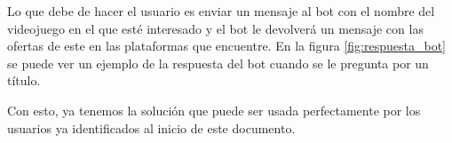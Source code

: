 Lo que debe de hacer el usuario es enviar un mensaje al bot con el nombre del 
videojuego en el que esté interesado y el bot le devolverá un mensaje con las 
ofertas de este en las plataformas que encuentre. En la figura 
\ref{fig:respuesta_bot} se puede ver un ejemplo de la respuesta del bot cuando se 
le pregunta por un título.

Con esto, ya tenemos la solución que puede ser usada perfectamente por los usuarios 
ya identificados al inicio de este documento.
